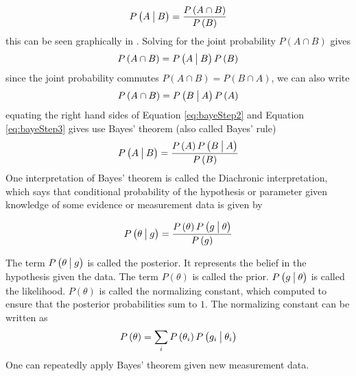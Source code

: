 \begin{equation}
	P \left( A \given[\big] B \right) = \frac{ P \left( A \cap B \right) }{ P \left( B \right)}
\end{equation} 
%
this can be seen graphically in . Solving for the joint probability $ P \left( A \cap B \right) $ gives
%
\begin{equation}
 P \left( A \cap B \right) =	P \left( A \given[\big] B \right)  P \left( B \right)
\label{eq:bayeStep2}
\end{equation} 
%
since the joint probability commutes $ P \left( A \cap B \right) = P \left( B \cap A \right) $, we can also write
%
\begin{equation}
 P \left( A \cap B \right) =	P \left( B \given[\big] A \right)  P \left( A \right)
\label{eq:bayeStep3}
\end{equation} 
%
equating the right hand sides of Equation \ref{eq:bayeStep2} and Equation \ref{eq:bayeStep3} gives use Bayes' theorem (also called Bayes' rule)
%
\begin{equation}
	P \left( A \given[\big] B \right) = \frac{ P \left( A \right) P \left( B \given[\big] A \right) }{ P \left( B \right) } 
	\label{eq:BayesTheoremBoxed}
\end{equation}
%
One interpretation of Bayes' theorem is called the Diachronic interpretation, which says that conditional probability of the hypothesis or parameter given knowledge of some evidence or measurement data is given by 

\begin{equation}
	P \left( \theta \given[\big] g \right) = \frac{ P \left( \theta \right) P \left( g \given[\big] \theta \right) }{ P \left( g \right) }
	\label{eq:diachronic}
\end{equation}

The term $ P \left( \theta \given[\big] g \right) $ is called the \gls{posterior}. It represents the belief in the hypothesis given the data. The term $ P \left( \theta \right) $ is called the \gls{prior}. $P \left( g \given[\big] \theta \right)$ is called the \gls{likelihood}. $P \left( \theta \right)$ is called the normalizing constant, which computed to ensure that the posterior probabilities sum to $1$.  The normalizing constant can be written as 
\begin{equation}
P \left( \theta \right) = \sum_{i} P \left( \theta_i \right) P \left( g_i \given[\big] \theta_i \right)
\label{eq:normalizingConstant}
\end{equation}
One can repeatedly apply Bayes' theorem given new measurement data. 

